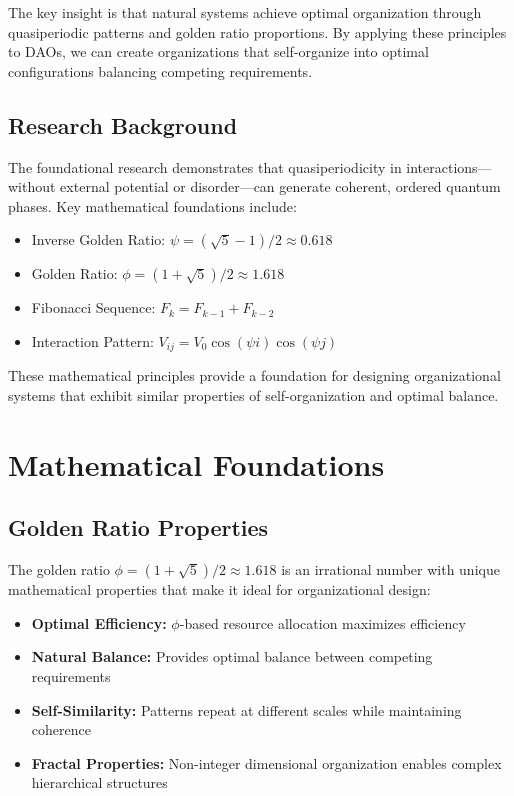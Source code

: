 \documentclass[AMA]{WileyNJD-AMA}
\begin{document}
The key insight is that natural systems achieve optimal organization through quasiperiodic patterns and golden ratio proportions. By applying these principles to DAOs, we can create organizations that self-organize into optimal configurations balancing competing requirements.

\subsection{Research Background}

The foundational research demonstrates that quasiperiodicity in interactions---without external potential or disorder---can generate coherent, ordered quantum phases. Key mathematical foundations include:

\begin{itemize}
    \item Inverse Golden Ratio: $\psi = (\sqrt{5}-1)/2 \approx 0.618$
    \item Golden Ratio: $\phi = (1+\sqrt{5})/2 \approx 1.618$
    \item Fibonacci Sequence: $F_k = F_{k-1} + F_{k-2}$
    \item Interaction Pattern: $V_{ij} = V_0 \cos(\psi i) \cos(\psi j)$
\end{itemize}

These mathematical principles provide a foundation for designing organizational systems that exhibit similar properties of self-organization and optimal balance.

\section{Mathematical Foundations}

\subsection{Golden Ratio Properties}

The golden ratio $\phi = (1+\sqrt{5})/2 \approx 1.618$ is an irrational number with unique mathematical properties that make it ideal for organizational design:

\begin{itemize}
    \item \textbf{Optimal Efficiency:} $\phi$-based resource allocation maximizes efficiency
    \item \textbf{Natural Balance:} Provides optimal balance between competing requirements
    \item \textbf{Self-Similarity:} Patterns repeat at different scales while maintaining coherence
    \item \textbf{Fractal Properties:} Non-integer dimensional organization enables complex hierarchical structures
\end{itemize}
\end{document}
